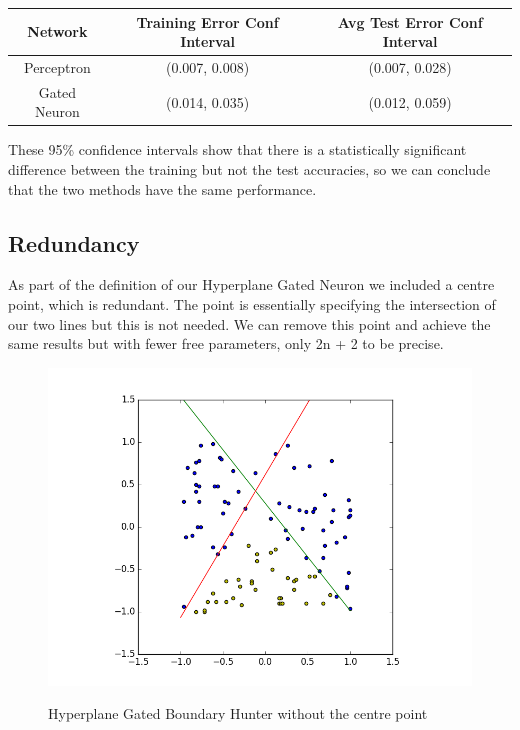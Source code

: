 \documentclass[notitlepage]{report}
\theoremstyle{definition}
\begin{document}
\begin{center}
\begin{tabular}{| c | c | c |}
\hline
Network & Training Error Conf Interval & Avg Test Error Conf Interval\\
\hline
\hline
Perceptron & (0.007, 0.008) & (0.007, 0.028)\\
\hline
Gated Neuron & (0.014, 0.035) & (0.012, 0.059)\\
\hline
\end{tabular}
\end{center}

These 95\% confidence intervals show that there is a statistically significant difference between the training but not the test accuracies, so we can conclude that the two methods have the same performance.

\subsection{Redundancy}
As part of the definition of our Hyperplane Gated Neuron we included a centre point, which is redundant. The point is essentially specifying the intersection of our two lines but this is not needed. We can remove this point and achieve the same results but with fewer free parameters, only 2n + 2 to be precise.

\begin{figure}[H]
  \centering
  \begin{minipage}[b]{0.8\textwidth}
    \includegraphics[width=\textwidth]{GN-MH-ONLY-01.png}
    \caption{}
  \end{minipage}
  \hfill

Hyperplane Gated Boundary Hunter without the centre point
\end{figure}
\end{document}
